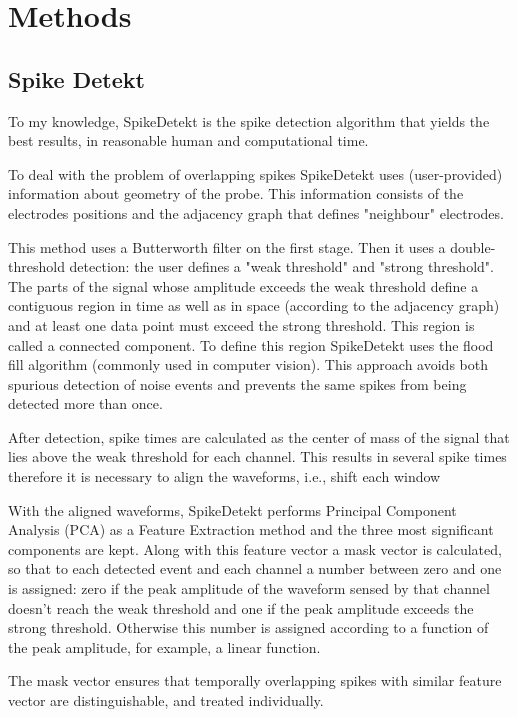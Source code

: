 
\section{Methods}
\label{sec:methods}
\subsection{Spike Detekt}
\label{subsec:spikedetekt}

To my knowledge, SpikeDetekt \cite{Rossant2016} is the spike detection algorithm that yields the best results, in reasonable human and computational time. 

To deal with the problem of overlapping spikes SpikeDetekt uses (user-provided) information about geometry of the probe. This information consists of the electrodes positions and the adjacency graph that defines "neighbour" electrodes. 

This method uses a Butterworth filter on the first stage. Then it uses a double-threshold detection: the user defines a "weak threshold" and "strong threshold". The parts of the signal whose amplitude exceeds the weak threshold define a contiguous region in time as well as in space (according to the adjacency graph) and at least one data point must exceed the strong threshold. This region is called a connected component. To define this region SpikeDetekt uses the flood fill algorithm (commonly used in computer vision). This approach avoids both spurious detection of noise events and prevents the same spikes from being detected more than once.
 
After detection, spike times are calculated as the center of mass of the signal that lies above the weak threshold for each channel. This results in several spike times therefore it is necessary to align the waveforms, i.e., shift each window 

With the aligned waveforms, SpikeDetekt performs Principal Component Analysis (PCA) as a Feature Extraction method and the three most significant components are kept. Along with this feature vector a mask vector is calculated, so that to each detected event and each channel a number between zero and one is assigned: zero if the peak amplitude of the waveform sensed by that channel doesn't reach the weak threshold and one if the peak amplitude exceeds the strong threshold. Otherwise this number is assigned according to a function of the peak amplitude, for example, a linear function.

The mask vector ensures that temporally overlapping spikes with similar feature vector are distinguishable, and treated individually.

